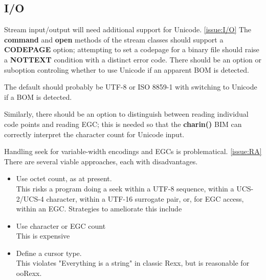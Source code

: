 \documentclass[b4paper]{article}
\begin{document}
\subsection{I/O}

Stream input/output will need additional support for Unicode.
\cref{issue:I/O}
The \textbf{command}  and \textbf{open} methods of the stream classes
should support a \textbf{CODEPAGE} option; attempting to set a
codepage for a binary file should raise a \textbf{NOTTEXT} condition
with a distinct error code.  There should be an option or suboption
controling whether to use Unicode if an apparent BOM is detected.

The default should probably be UTF-8 or ISO 8859-1 with switching to
Unicode if a BOM is detected.

Similarly, there should be an option to distinguish between reading
individual code points and reading EGC; this is needed so that the
\textbf{charin()} BIM can correctly interpret the character count for Unicode input.

Handling seek for variable-width encodings and EGCs is problematical.
\cref{issue:RA}
There are several viable approaches, each with disadvantages.

\begin{itemize}
\item Use octet count, as at present. \\
This risks a program doing a seek within a UTF-8 sequence,
within a UCS-2/UCS-4 character,
within a UTF-16 surrogate pair,
or, for EGC access, within an EGC.
Strategies to ameliorate this include
\item Use character or EGC count \\
This is expensive
\item Define a cursor type. \\
This violates "Everything is a string" in classic Rexx, but is reasonable for ooRexx.
\end{itemize}
\end{document}
